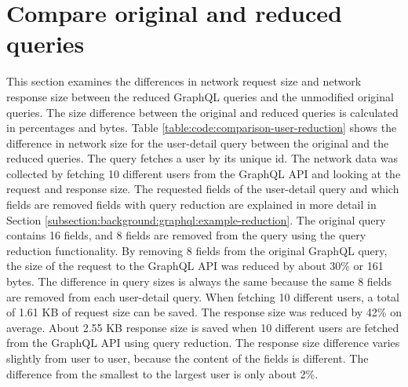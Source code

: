 \section{Compare original and reduced queries}

This section examines the differences in network request size and network response size between the reduced GraphQL queries and the unmodified original queries. The size difference between the original and reduced queries is calculated in percentages and bytes. Table \ref{table:code:comparison-user-reduction} shows the difference in network size for the user-detail query between the original and the reduced queries. The query fetches a user by its unique id. The network data was collected by fetching 10 different users from the GraphQL \ac{API} and looking at the request and response size. The requested fields of the user-detail query and which fields are removed fields with query reduction are explained in more detail in Section \ref{subsection:background:graphql:example-reduction}. The original query contains 16 fields, and 8 fields are removed from the query using the query reduction functionality. By removing 8 fields from the original GraphQL query, the size of the request to the GraphQL \ac{API} was reduced by about 30\% or 161 bytes. The difference in query sizes is always the same because the same 8 fields are removed from each user-detail query. When fetching 10 different users, a total of 1.61 KB of request size can be saved. The response size was reduced by 42\% on average. About 2.55 KB response size is saved when 10 different users are fetched from the GraphQL \ac{API} using query reduction. The response size difference varies slightly from user to user, because the content of the fields is different. The difference from the smallest to the largest user is only about 2\%.

